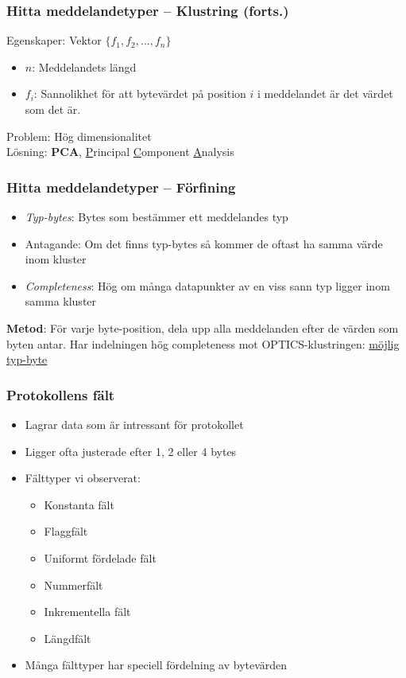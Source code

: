 \documentclass[xetex]{beamer}
\begin{document}
    \begin{frame}
        \frametitle{Hitta meddelandetyper -- Klustring (forts.)}
        Egenskaper: Vektor $\{f_1, f_2, ..., f_n\}$
        \begin{itemize}
            \item $n$: Meddelandets längd
            \item $f_i$: Sannolikhet för att bytevärdet på position $i$ i
                meddelandet är det värdet som det är.
        \end{itemize}
        \vskip20pt
        Problem: Hög dimensionalitet \\
        Lösning: \textbf{PCA}, \scriptsize{\underline{P}rincipal
            \underline{C}omponent \underline{A}nalysis}
    \end{frame}
    \begin{frame}
        \frametitle{Hitta meddelandetyper -- Förfining}
        \begin{itemize}
            \item \emph{Typ-bytes}: Bytes som bestämmer ett meddelandes typ \\
            \item Antagande: Om det finns typ-bytes så kommer de oftast ha
                samma värde inom kluster \\
            \item \emph{Completeness}: Hög om många datapunkter av en viss
                sann typ ligger inom samma kluster
        \end{itemize}
        \vskip20pt
        \textbf{Metod}: För varje byte-position, dela upp alla meddelanden
        efter de värden som byten antar. Har indelningen hög completeness mot
        OPTICS-klustringen: \underline{möjlig typ-byte}
    \end{frame}

    \begin{frame}
        \frametitle{Protokollens fält}
        \begin{itemize}
            \item Lagrar data som är intressant för protokollet
            \item Ligger ofta justerade efter 1, 2 eller 4 bytes
            \item Fälttyper vi observerat:
                \begin{itemize}
                    \item Konstanta fält
                    \item Flaggfält
                    \item Uniformt fördelade fält
                    \item Nummerfält
                    \item Inkrementella fält
                    \item Längdfält
                \end{itemize}
            \item Många fälttyper har speciell fördelning av bytevärden
        \end{itemize}
    \end{frame}
\end{document}
